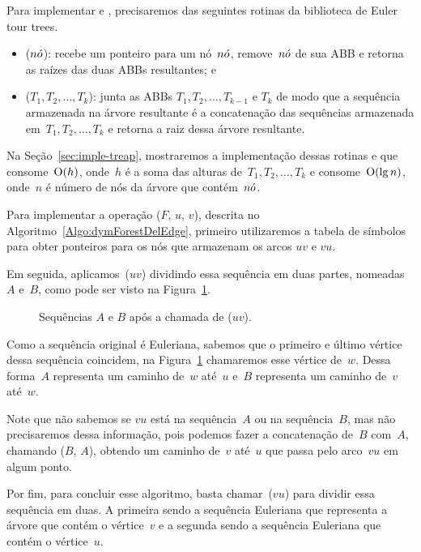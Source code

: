 Para implementar \dymForestAddEdge{} e \dymForestDelEdge{}, precisaremos das seguintes rotinas da biblioteca de Euler tour trees. 
\begin{itemize}
\item \treapSplit($n\acute{o}$): recebe um ponteiro para um nó~$n\acute{o}$, remove~$n\acute{o}$ de sua ABB e retorna as raízes das duas ABBs resultantes; e
\item \treapJoin($T_1, T_2, \ldots, T_k$): junta as ABBs $T_1, T_2, \ldots, T_{k-1}$ e $T_k$ de modo que a sequência armazenada na árvore resultante é a concatenação das sequências armazenada em~$T_1, T_2, \ldots, T_k$ e retorna a raiz dessa árvore resultante.
\end{itemize}

Na Seção~\ref{sec:imple-treap}, mostraremos a implementação dessas rotinas e que~\treapJoin{} consome~$\mathrm{O}(h)$, onde~$h$ é a soma das alturas de~$T_1, T_2, \ldots, T_k$ e \treapSplit{} consome~$\mathrm{O}(\lg n)$, onde~$n$ é número de nós da árvore que contém~$n\acute{o}$.

Para implementar a operação \dymForestDelEdge($F$, $u$, $v$), descrita no Algoritmo~\ref{Algo:dymForestDelEdge}, 
primeiro utilizaremos a tabela de símbolos para obter ponteiros para os nós que armazenam os arcos $uv$ e $vu$.

Em seguida, aplicamos~\treapSplit($uv$) dividindo essa sequência em duas partes, nomeadas~$A$ e~$B$, como pode ser visto na Figura~\ref{fig:algorit-cut-seqxy}.
\begin{figure}[htb]
\centering

\caption{Sequências $A$ e $B$ após a chamada de \treapSplit($uv$).}
\label{fig:algorit-cut-seqxy}
\end{figure}

Como a sequência original é Euleriana, sabemos que o primeiro e último vértice dessa sequência coincidem, na Figura~\ref{fig:algorit-cut-seqxy} chamaremos esse vértice de~$w$.
Dessa forma~$A$ representa um caminho de~$w$ até~$u$ e~$B$ representa um caminho de~$v$ até~$w$.

Note que não sabemos se $vu$ está na sequência~$A$ ou na sequência~$B$, mas não precisaremos dessa informação, pois podemos fazer a concatenação de~$B$ com~$A$,
chamando \treapJoin($B$, $A$), obtendo um caminho de~$v$ até~$u$ que passa pelo arco~$vu$ em algum ponto.

Por fim, para concluir esse algoritmo, basta chamar~\treapSplit($vu$) para dividir essa sequência em duas.
A primeira sendo a sequência Euleriana que representa a árvore que contém o vértice~$v$ e a segunda sendo a sequência Euleriana que contém o vértice~$u$.

